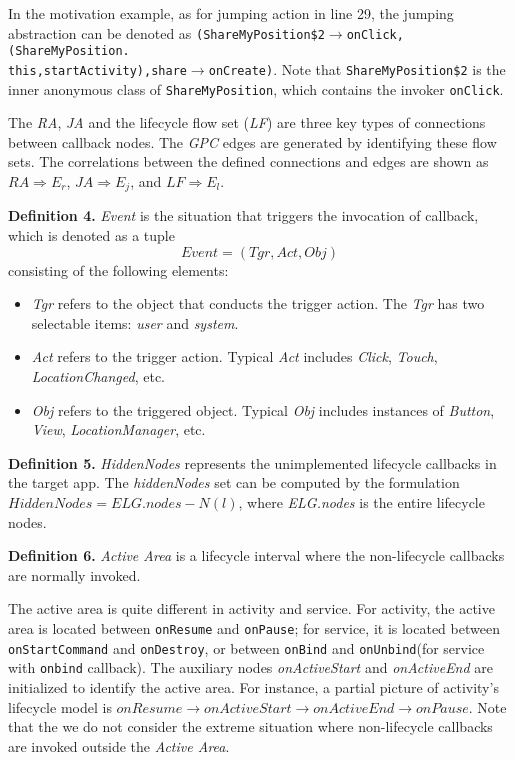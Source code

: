 In the motivation example, as for jumping action in line 29, the jumping abstraction can be denoted as \texttt{(ShareMyPosition\$2}$\rightarrow$\texttt{onClick,(ShareMyPosition.\\
this,startActivity),share}$\rightarrow$\texttt{onCreate)}. Note that \texttt{ShareMyPosition\$2} is the inner anonymous class of \texttt{ShareMyPosition}, which contains the invoker \texttt{onClick}.


The \textit{RA}, \textit{JA} and the lifecycle flow set (\textit{LF}) are three key types of connections between callback nodes. The \textit{GPC} edges are generated by identifying these flow sets. The correlations between the defined connections and edges are shown as
$RA \Rightarrow E_{r}$,
$JA \Rightarrow E_{j}$, and
$LF \Rightarrow E_{l}$.

\textbf{Definition 4.} \textit{Event} is the situation that triggers the invocation of callback, which is denoted as a tuple
\begin{equation}
Event = (Tgr, Act, Obj)
\end{equation}
consisting of the following elements:
\begin{itemize}
\item \textit{Tgr} refers to the object that conducts the trigger action. The \textit{Tgr} has two selectable items: \textit{user} and \textit{system}.
\item \textit{Act} refers to the trigger action. Typical \textit{Act} includes \textit{Click}, \textit{Touch}, \textit{LocationChanged}, etc.
\item \textit{Obj} refers to the triggered object. Typical \textit{Obj} includes instances of \textit{Button}, \textit{View}, \textit{LocationManager}, etc.
\end{itemize}

\textbf{Definition 5.} \textit{HiddenNodes} represents the unimplemented lifecycle callbacks in the target app. The \textit{hiddenNodes} set can be computed by the formulation
 $ HiddenNodes = ELG.nodes - N(l) $, where \textit{ELG.nodes} is the entire lifecycle nodes.

\textbf{Definition 6.} \textit{Active Area} is a lifecycle interval where the non-lifecycle callbacks are normally invoked.

The active area is quite different in activity and service. For activity, the active area is located between \texttt{onResume} and \texttt{onPause}; for service, it is located between \texttt{onStartCommand} and \texttt{onDestroy}, or between \texttt{onBind} and \texttt{onUnbind}(for service with \texttt{onbind} callback). The auxiliary nodes \textit{onActiveStart} and \textit{onActiveEnd} are initialized to identify the active area. For instance, a partial picture of activity's lifecycle model is  $onResume\rightarrow onActiveStart\rightarrow onActiveEnd\rightarrow onPause$.
Note that the we do not consider the extreme situation where non-lifecycle callbacks are invoked outside the \textit{Active Area}.